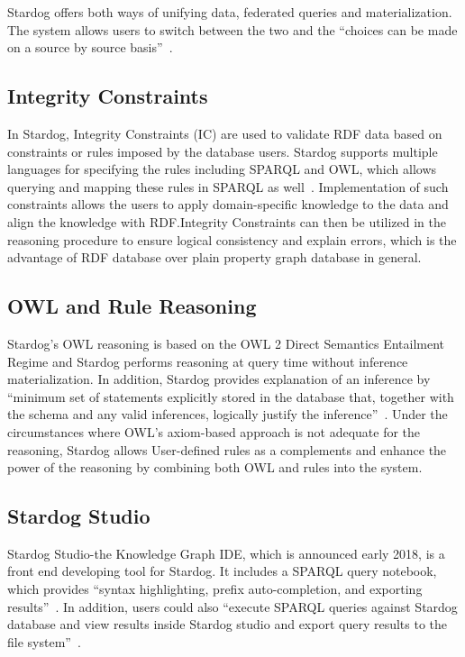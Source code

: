 		Stardog offers both ways of unifying data, federated queries and 
		materialization. The system allows users to switch between the two and 
		the ``choices can be made on a source by source 
		basis''~\cite{hid-sp18-405-blog-stardog-virtual}.
	
	\subsection{Integrity Constraints}
		In Stardog, Integrity Constraints (IC) are used to validate RDF data 
		based on constraints or rules imposed by the database users. Stardog 
		supports multiple languages for specifying the rules including SPARQL 
		and OWL, which allows querying and mapping these rules in SPARQL as 
		well~\cite{hid-sp18-405-www-stardog-docs}. Implementation of such 
		constraints allows the users to apply domain-specific knowledge to the 
		data and align the knowledge with RDF.\@ Integrity Constraints can then 
		be utilized in the reasoning procedure to ensure logical consistency and 
		explain errors, which is the advantage of RDF database over plain 
		property graph database in general. 

	\subsection{OWL and Rule Reasoning}
		Stardog’s OWL reasoning is based on the OWL 2 Direct Semantics 
		Entailment Regime and Stardog performs reasoning at query time 
		without inference materialization. In addition, Stardog provides 
		explanation of an inference by ``minimum set of statements explicitly 
		stored in the database that, together with the schema and any valid 
		inferences, logically justify the 
		inference''~\cite{hid-sp18-405-www-stardog-docs}. Under the 
		circumstances where OWL’s axiom-based approach is not adequate for 
		the reasoning, Stardog allows User-defined rules as a complements and 
		enhance the power of the reasoning by combining both OWL and rules 
		into the system. 

	\subsection{Stardog Studio}
		Stardog Studio-the Knowledge Graph IDE, which is announced early 
		2018, is a front end developing tool for Stardog. It includes a SPARQL 
		query notebook, which provides ``syntax highlighting, prefix 
		auto-completion, and exporting 
		results''~\cite{hid-sp18-405-blog-stardog-studio}. In addition, users 
		could also ``execute SPARQL queries against Stardog database and 
		view results inside Stardog studio and export query results to the file 
		system''~\cite{hid-sp18-405-www-stardog-studio}.
		
